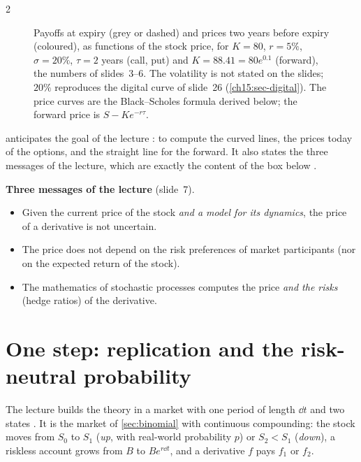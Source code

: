 \begin{paracol}{2}
\begin{figure}[ht]
\caption{Payoffs at expiry (grey or dashed) and prices two years before expiry (coloured), as functions of the stock price,
for $K=80$, $r=5\%$, $\sigma=20\%$, $\tau=2$ years (call, put) and $K=88.41=80e^{0.1}$ (forward), the numbers of slides~3--6.
The volatility is not stated on the slides; $20\%$ reproduces the digital curve of slide~26 (\cref{ch15:sec-digital}).
The price curves are the Black--Scholes formula derived below; the forward price is $S-Ke^{-r\tau}$.}\label{ch15:fig-payoffs}
\end{figure}

 anticipates the goal of the lecture : to compute the curved lines, the prices today
of the options, and the straight line for the forward. It also states the three messages of the lecture, which are exactly
the content of the box below .

\begin{keyformulas}
\textbf{Three messages of the lecture} (slide~7).
\begin{itemize}
  \item Given the current price of the stock \emph{and a model for its dynamics}, the price of a derivative is
        not uncertain.
  \item The price does not depend on the risk preferences of market participants (nor on the expected return of the stock).
  \item The mathematics of stochastic processes computes the price \emph{and the risks} (hedge ratios) of the derivative.
\end{itemize}
\end{keyformulas}

\section{One step: replication and the risk-neutral probability}\label{ch15:sec-onestep}
The lecture builds the theory in a market with one period of length $\dd t$ and two states . It is
the market of \cref{sec:binomial} with continuous compounding: the stock moves from $S_0$ to $S_1$ (\emph{up}, with real-world
probability $p$) or $S_2<S_1$ (\emph{down}), a riskless account grows from $B$ to $Be^{r\dd t}$, and a derivative $f$ pays $f_1$ or $f_2$.


\end{paracol}

